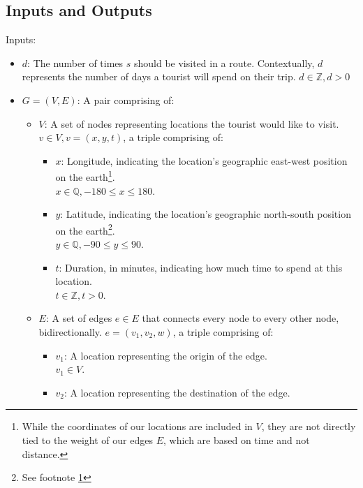\subsection{Inputs and Outputs}\label{subsec:inputs-and-outputs}
Inputs:
\begin{itemize}
    \item $d$: The number of times $s$ should be visited in a route.
    Contextually, $d$ represents the number of days a tourist will spend on their trip. $d \in \mathbb{Z}, d > 0$
    \item $G = (V, E)$: A pair comprising of:
    \begin{itemize}
        \item[\textbullet] $V$: A set of nodes representing locations the tourist would like to visit.
        $v \in V, v = (x, y, t)$, a triple comprising of:
        \begin{itemize}
            \item[\textbullet]$x$: Longitude, indicating the location's geographic east-west position on the
            earth\footnote{\label{latitude-longitude-note}While the coordinates of our locations are
            included in $V$, they are not directly tied to the weight of our edges $E$, which are based on
            time and not distance.}.\\
            $x \in \mathbb{Q}, -180 \leq x \leq 180$.
            \item[\textbullet]$y$: Latitude, indicating the location's geographic north-south position on
            the earth\footnote{See footnote \ref{latitude-longitude-note}}.\\
            $y \in \mathbb{Q}, -90 \leq y \leq 90$.
            \item[\textbullet]$t$: Duration, in minutes, indicating how much time to spend at this location.\\
            $t \in \mathbb{Z}, t > 0$.
        \end{itemize}
        \item[\textbullet] $E$: A set of edges $e \in E$ that connects every node to every other node,
        bidirectionally. $e = (v_1, v_2, w)$, a triple comprising of:
        \begin{itemize}
            \item[\textbullet]$v_1$: A location representing the origin of the edge.\\
            $v_1 \in V$.
            \item[\textbullet]$v_2$: A location representing the destination of the edge.\\

\end{itemize}
\end{itemize}
\end{itemize}
